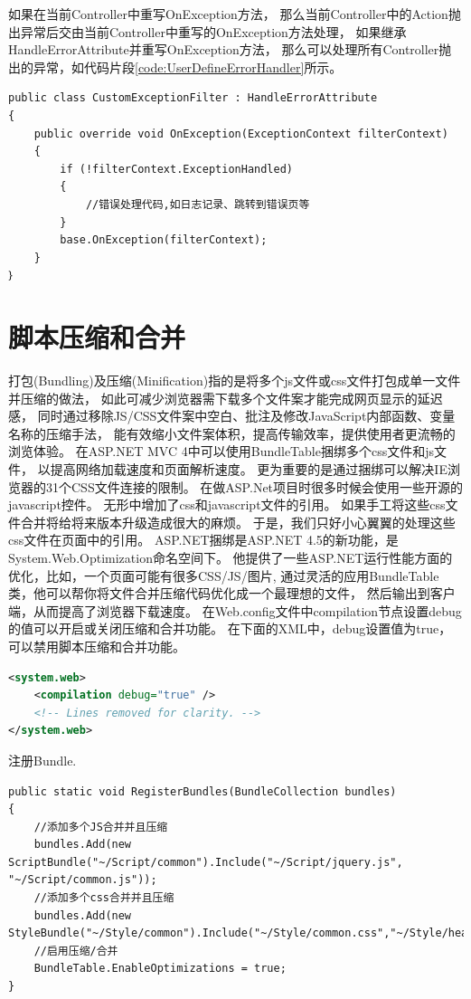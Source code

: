 \documentclass{book}
\begin{document}
如果在当前Controller中重写OnException方法，
那么当前Controller中的Action抛出异常后交由当前Controller中重写的OnException方法处理，
如果继承HandleErrorAttribute并重写OnException方法，
那么可以处理所有Controller抛出的异常，如代码片段\ref{code:UserDefineErrorHandler}所示。

\begin{lstlisting}[language={[Sharp]C},caption=自定义Handler错误处理,label=code:UserDefineErrorHandler]
public class CustomExceptionFilter : HandleErrorAttribute
{
	public override void OnException(ExceptionContext filterContext)
	{
	    if (!filterContext.ExceptionHandled)
	    {        
	        //错误处理代码,如日志记录、跳转到错误页等           
	    }
	    base.OnException(filterContext);
	}
｝
\end{lstlisting}

\section{脚本压缩和合并}

打包(Bundling)及压缩(Minification)指的是将多个js文件或css文件打包成单一文件并压缩的做法，
如此可减少浏览器需下载多个文件案才能完成网页显示的延迟感，
同时通过移除JS/CSS文件案中空白、批注及修改JavaScript内部函数、变量名称的压缩手法，
能有效缩小文件案体积，提高传输效率，提供使用者更流畅的浏览体验。
在ASP.NET MVC 4中可以使用BundleTable捆绑多个css文件和js文件，
以提高网络加载速度和页面解析速度。
更为重要的是通过捆绑可以解决IE浏览器的31个CSS文件连接的限制。
在做ASP.Net项目时很多时候会使用一些开源的javascript控件。
无形中增加了css和javascript文件的引用。
如果手工将这些css文件合并将给将来版本升级造成很大的麻烦。
于是，我们只好小心翼翼的处理这些css文件在页面中的引用。
ASP.NET捆绑是ASP.NET 4.5的新功能，是System.Web.Optimization命名空间下。
他提供了一些ASP.NET运行性能方面的优化，比如，一个页面可能有很多CSS/JS/图片,
通过灵活的应用BundleTable类，他可以帮你将文件合并压缩代码优化成一个最理想的文件，
然后输出到客户端，从而提高了浏览器下载速度。
在Web.config文件中compilation节点设置debug的值可以开启或关闭压缩和合并功能。 
在下面的XML中，debug设置值为true，可以禁用脚本压缩和合并功能。

\begin{lstlisting}[language=XML]
<system.web>
    <compilation debug="true" />
    <!-- Lines removed for clarity. -->
</system.web>
\end{lstlisting}

注册Bundle.

\begin{lstlisting}[language={[Sharp]C}]
public static void RegisterBundles(BundleCollection bundles)
{	
	//添加多个JS合并并且压缩	
    bundles.Add(new ScriptBundle("~/Script/common").Include("~/Script/jquery.js", "~/Script/common.js"));  
    //添加多个css合并并且压缩           
    bundles.Add(new StyleBundle("~/Style/common").Include("~/Style/common.css","~/Style/header.css"));
	//启用压缩/合并
	BundleTable.EnableOptimizations = true;
}
\end{lstlisting}
\end{document}
